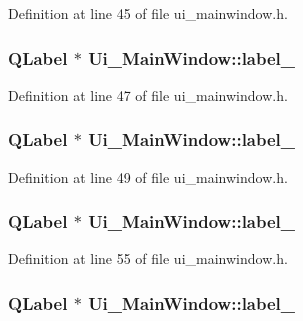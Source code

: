 Definition at line 45 of file ui\+\_\+mainwindow.\+h.

\subsubsection[{\texorpdfstring{label\+\_\+4}{label_4}}]{\setlength{\rightskip}{0pt plus 5cm}Q\+Label $\ast$ Ui\+\_\+\+Main\+Window\+::label\+\_}\hypertarget{class_ui___main_window_a953dcd0e658a0903339e2ef3c94d4e7e}{}\label{class_ui___main_window_a953dcd0e658a0903339e2ef3c94d4e7e}


Definition at line 47 of file ui\+\_\+mainwindow.\+h.

\subsubsection[{\texorpdfstring{label\+\_\+5}{label_5}}]{\setlength{\rightskip}{0pt plus 5cm}Q\+Label $\ast$ Ui\+\_\+\+Main\+Window\+::label\+\_}\hypertarget{class_ui___main_window_af121c391d64554ab2602ae6174e03d95}{}\label{class_ui___main_window_af121c391d64554ab2602ae6174e03d95}


Definition at line 49 of file ui\+\_\+mainwindow.\+h.

\subsubsection[{\texorpdfstring{label\+\_\+6}{label_6}}]{\setlength{\rightskip}{0pt plus 5cm}Q\+Label $\ast$ Ui\+\_\+\+Main\+Window\+::label\+\_}\hypertarget{class_ui___main_window_ac10ed68694c23da02ddc0ceacd54ef01}{}\label{class_ui___main_window_ac10ed68694c23da02ddc0ceacd54ef01}


Definition at line 55 of file ui\+\_\+mainwindow.\+h.

\subsubsection[{\texorpdfstring{label\+\_\+7}{label_7}}]{\setlength{\rightskip}{0pt plus 5cm}Q\+Label $\ast$ Ui\+\_\+\+Main\+Window\+::label\+\_}\hypertarget{class_ui___main_window_a9687c8357009cfcf28517fa276ea1918}{}\label{class_ui___main_window_a9687c8357009cfcf28517fa276ea1918}


